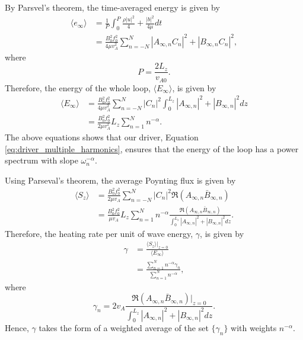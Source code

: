 By Parsvel's theorem, the time-averaged energy is given by
\begin{equation}
    \begin{aligned}
    \langle e_\infty \rangle &=\frac{1}{P}\int_0^{P}\frac{\rho |u|^2}{4} + \frac{|b|^2}{4\mu}dt
\\&=\frac{B_0^2f_0^2}{4\mu v_A^2}\sum_{n=-N}^N |A_{\infty,n} C_n|^2 + |B_{\infty,n} C_n|^2,
    \end{aligned}
\end{equation}
where
\begin{equation}
    P = \frac{2L_z}{v_{A0}}.
\end{equation}
Therefore, the energy of the whole loop, $\langle E_\infty \rangle$, is given by
\begin{equation}
    \begin{aligned}
    \langle E_\infty \rangle &= \frac{B_0^2f_0^2}{4\mu v_A^2}\sum_{n=-N}^N|C_n|^2\int_0^{L_z}|A_{\infty,n}|^2+|B_{\infty,n}|^2 dz \\
    &= \frac{B_0^2f_0^2}{2\mu v_A^2}L_z\sum_{n=1}^Nn^{-\alpha}.
    \end{aligned}
\end{equation}
The above equations shows that our driver, Equation \eqref{eq:driver_multiple_harmonics}, ensures that the energy of the loop has a power spectrum with slope $\omega_n^{-\alpha}$.

Using Parseval's theorem, the average Poynting flux is given by
\begin{equation}
    \begin{aligned}
    \langle S_z \rangle &= \frac{B_0^2f_0^2}{2\mu v_A}\sum_{n=-N}^N|C_n|^2\Re(A_{\infty,n}\bar{B}_{\infty,n}) \\
    &= \frac{B_0^2f_0^2}{\mu v_A}L_z\sum_{n=1}^Nn^{-\alpha}\frac{\Re(A_{\infty,n}\bar{B}_{\infty,n})}{\int_0^{L_z}|A_{\infty,n}|^2+|B_{\infty,n}|^2dz}.
    \end{aligned}
\end{equation}
Therefore, the heating rate per unit of wave energy, $\gamma$, is given by
\begin{equation}
    \label{eq:gamma_multiple_harmonics_exact}
    \begin{aligned}
    \gamma &= \frac{\langle S_z\rangle|_{z=0}}{\langle E_{\infty} \rangle} \\
    &=\frac{\sum_{n=1}^Nn^{-\alpha}\gamma_n}{\sum_{n=1}^Nn^{-\alpha}},
    \end{aligned}
\end{equation}
where
\begin{equation}
    \gamma_n = 2v_A\frac{\Re(A_{\infty,n}\bar{B}_{\infty,n})|_{z=0}}{\int_0^{L_z}|A_{\infty,n}|^2+|B_{\infty,n}|^2dz}.
\end{equation}
Hence, $\gamma$ takes the form of a weighted average of the set $\{\gamma_n\}$ with weights $n^{-\alpha}$.

